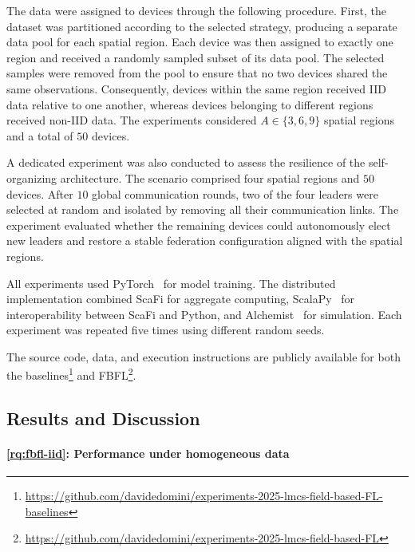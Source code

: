 The data were assigned to devices through the following procedure.
%
First, 
 the dataset was partitioned according to the selected strategy, 
 producing a separate data pool for each spatial region.
%
Each device was then assigned to exactly one region 
 and received a randomly sampled subset of its data pool.
%
The selected samples were removed from the pool to ensure 
 that no two devices shared the same observations.
%
Consequently, 
 devices within the same region received \gls{IID} data relative to one another, 
 whereas devices belonging to different regions received non-\gls{IID} data.
%
The experiments considered \(A\in\{3,6,9\}\) spatial regions 
 and a total of \(50\) devices.

A dedicated experiment was also conducted to assess the resilience 
 of the self-organizing architecture.
%
The scenario comprised four spatial regions and \(50\) devices.
%
After \(10\) global communication rounds, 
 two of the four leaders were selected at random and isolated 
 by removing all their communication links.
%
The experiment evaluated whether the remaining devices could autonomously elect new leaders 
 and restore a stable federation configuration aligned with the spatial regions.

All experiments used PyTorch~\cite{paszke2017automatic}
 for model training.
%
The distributed implementation combined ScaFi for aggregate computing,
 ScalaPy~\cite{DBLP:conf/scala/LaddadS20} for interoperability between ScaFi and Python, 
 and Alchemist~\cite{DBLP:journals/jos/PianiniMV13} for simulation.
%
Each experiment was repeated five times using different random seeds.

The source code, data, and execution instructions are publicly available for both the 
baselines\footnote{\url{https://github.com/davidedomini/experiments-2025-lmcs-field-based-FL-baselines}}
and
\gls{FBFL}\footnote{\url{https://github.com/davidedomini/experiments-2025-lmcs-field-based-FL}}.


\subsection{Results and Discussion}
\label{sec:fbfl-results}


\paragraph{\ref{rq:fbfl-iid}: Performance under homogeneous data}

